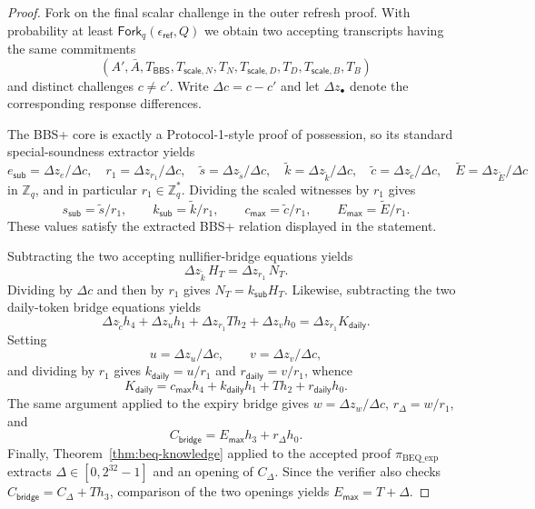 \documentclass[11pt]{article}
\theoremstyle{definitionstyle}
\theoremstyle{plain}
\begin{document}
\begin{proof}
Fork on the final scalar challenge in the outer refresh proof. With probability at least $\mathsf{Fork}_q(\epsilon_{\mathsf{ref}},Q)$ we obtain two accepting transcripts having the same commitments
\[
(A',\bar{A},T_{\mathsf{BBS}},T_{\mathsf{scale},N},T_N,T_{\mathsf{scale},D},T_D,T_{\mathsf{scale},B},T_B)
\]
and distinct challenges $c \neq c'$. Write $\Delta c = c-c'$ and let $\Delta z_\bullet$ denote the corresponding response differences.

The BBS+ core is exactly a Protocol-1-style proof of possession, so its standard special-soundness extractor yields
\[
e_{\mathsf{sub}} = \Delta z_e/\Delta c,\quad r_1 = \Delta z_{r_1}/\Delta c,\quad \tilde{s}=\Delta z_{\tilde{s}}/\Delta c,\quad \tilde{k}=\Delta z_{\tilde{k}}/\Delta c,\quad \tilde{c}=\Delta z_{\tilde{c}}/\Delta c,\quad \tilde{E}=\Delta z_{\tilde{E}}/\Delta c
\]
in $\mathbb{Z}_q$, and in particular $r_1 \in \mathbb{Z}_q^*$. Dividing the scaled witnesses by $r_1$ gives
\[
s_{\mathsf{sub}}=\tilde{s}/r_1,\qquad k_{\mathsf{sub}}=\tilde{k}/r_1,\qquad c_{\mathsf{max}}=\tilde{c}/r_1,\qquad E_{\mathsf{max}}=\tilde{E}/r_1.
\]
These values satisfy the extracted BBS+ relation displayed in the statement.

Subtracting the two accepting nullifier-bridge equations yields
\[
\Delta z_{\tilde{k}}\, H_T = \Delta z_{r_1}\, N_T.
\]
Dividing by $\Delta c$ and then by $r_1$ gives $N_T = k_{\mathsf{sub}} H_T$. Likewise, subtracting the two daily-token bridge equations yields
\[
\Delta z_{\tilde{c}} h_4 + \Delta z_u h_1 + \Delta z_{r_1} T h_2 + \Delta z_v h_0 = \Delta z_{r_1} K_{\mathsf{daily}}.
\]
Setting
\[
u = \Delta z_u/\Delta c,\qquad v = \Delta z_v/\Delta c,
\]
and dividing by $r_1$ gives $k_{\mathsf{daily}} = u/r_1$ and $r_{\mathsf{daily}} = v/r_1$, whence
\[
K_{\mathsf{daily}} = c_{\mathsf{max}} h_4 + k_{\mathsf{daily}} h_1 + T h_2 + r_{\mathsf{daily}} h_0.
\]
The same argument applied to the expiry bridge gives $w = \Delta z_w/\Delta c$, $r_{\Delta}=w/r_1$, and
\[
C_{\mathsf{bridge}} = E_{\mathsf{max}} h_3 + r_{\Delta} h_0.
\]
Finally, Theorem~\ref{thm:beq-knowledge} applied to the accepted proof $\pi_{\text{BEQ\_exp}}$ extracts $\Delta \in [0,2^{32}-1]$ and an opening of $C_{\Delta}$. Since the verifier also checks $C_{\mathsf{bridge}} = C_{\Delta} + T h_3$, comparison of the two openings yields $E_{\mathsf{max}} = T+\Delta$.
\end{proof}
\end{document}
